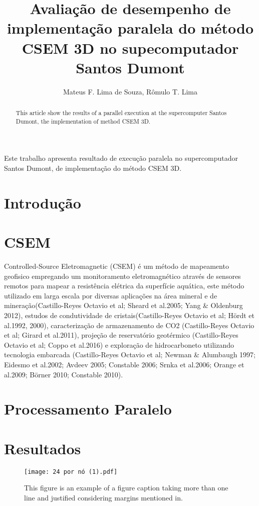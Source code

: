 \documentclass[12pt]{article}
\title{Avaliação de desempenho de implementação paralela do método CSEM 3D no supecomputador Santos Dumont}
\author{Mateus F. Lima de Souza\inst{1,2}, Rômulo T. Lima\inst{1,3}}
\begin{document}
 

\maketitle

\begin{abstract}
  This article show the results of a parallel execution at the supercomputer Santos Dumont, the implementation of method CSEM 3D.
\end{abstract}
     
\begin{resumo} 
  Este trabalho apresenta resultado de execução paralela no supercomputador Santos Dumont, de implementação do método CSEM 3D.
\end{resumo}


\section{Introdução}

\section{CSEM} \label{sec:firstpage}
Controlled-Source Eletromagnetic (CSEM) é um método de mapeamento geofisico empregando um monitoramento eletromagnético através de sensores remotos para mapear a resistência elétrica da superfície aquática, este método utilizado em larga escala por diversas aplicações na área mineral e de mineração(Castillo-Reyes
Octavio et al; Sheard et al.2005; Yang \& Oldenburg 2012), estudos de condutividade de cristais(Castillo-Reyes
Octavio et al; Hördt et al.1992, 2000), caracterização de armazenamento de CO2 (Castillo-Reyes
Octavio et al; Girard et al.2011), projeção de reservatório geotérmico (Castillo-Reyes
Octavio et al; Coppo et al.2016) e exploração de hidrocarboneto utilizando tecnologia embarcada (Castillo-Reyes
Octavio et al; Newman \& Alumbaugh 1997; Eidesmo et al.2002; Avdeev 2005; Constable 2006; Srnka et al.2006; Orange et al.2009; Börner 2010; Constable 2010). 
\section{Processamento Paralelo}

\section{Resultados}

\begin{figure}[ht]
\centering
\texttt{[image: 24 por nó (1).pdf]}
\caption{This figure is an example of a figure caption taking more than one line and justified considering margins mentioned in.}
\label{fig:24porno}
\end{figure}
\end{document}
